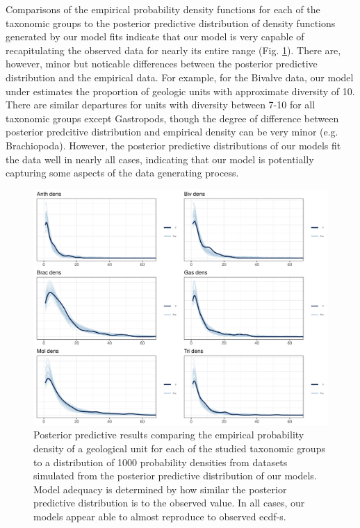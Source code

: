 \documentclass[12pt,letterpaper]{article}
\begin{document}
Comparisons of the empirical probability density functions for each of the taxonomic groups to the posterior predictive distribution of density functions generated by our model fits indicate that our model is very capable of recapitulating the observed data for nearly its entire range (Fig. \ref{fig:ppc_dens}). There are, however, minor but noticable differences between the posterior predictive distribution and the empirical data. For example, for the Bivalve data, our model under estimates the proportion of geologic units with approximate diversity of 10. There are similar departures for units with diversity between 7-10 for all taxonomic groups except Gastropods, though the degree of difference between posterior predcitive distribution and empirical density can be very minor (e.g. Brachiopoda). However, the posterior predictive distributions of our models fit the data well in nearly all cases, indicating that our model is potentially capturing some aspects of the data generating process.
\begin{figure}[ht]
  \centering
  \includegraphics[width=\textwidth,height=0.5\textheight,keepaspectratio=true]{figure/ppc_dens_zoom_diversity}
  \caption{Posterior predictive results comparing the empirical probability density of a geological unit for each of the studied taxonomic groups to a distribution of 1000 probability densities from datasets simulated from the posterior predictive distribution of our models. Model adequacy is determined by how similar the posterior predictive distribution is to the observed value. In all cases, our models appear able to almost reproduce to observed ecdf-s.}
  \label{fig:ppc_dens}
\end{figure}
\end{document}
